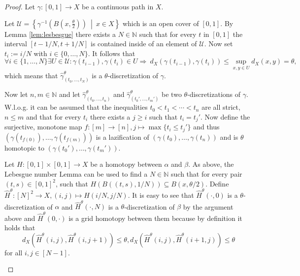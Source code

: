 \documentclass[a4paper, 11pt, twoside]{article}
\newcommand{\N}[0]{\mathbb{N}}
\theoremstyle{break}
\theoremstyle{break}
\begin{document}
\begin{proof}
  Let $\gamma\colon [0,1] \to X$ be a continuous path in $X$. 
  
  Let $\mathcal{U} = \left\{\gamma^{-1}\left(B(x,\tfrac{\theta}{2})\right) \: \middle| \: x \in X \right\}$ which is an open cover of $[0,1]$.
  By Lemma \ref{lem:lesbesgue} there exists a $N \in \N$ such that for every $t$ in $[0,1]$ the interval $[t-1/N, t+1/N]$ is contained inside of an element of $\mathcal{U}$.
  Now set $t_i := i/N$ with $i \in \{0, \ldots, N\}$. It follows that
  \begin{equation*}
    \forall i \in \{1, \ldots, N\}\exists U \in \mathcal{U}\colon \gamma(t_{i-1}), \gamma(t_i) \in U \Rightarrow \: d_X(\gamma(t_{i-1}), \gamma(t_i)) \leq \sup\limits_{x,y \in U} d_X(x,y) = \theta,
  \end{equation*}
  which means that $\widehat{\gamma}^{\theta}_{(t_0, \ldots, t_N)}$ is a $\theta$-discretization of $\gamma$.

  Now let $n,m \in \N$ and let $\widehat{\gamma}_{(t_0, \ldots, t_n)}^{\theta}$ and $\widehat{\gamma}_{(t_0', \ldots, t_m')}^{\theta}$ be two $\theta$-discretizations of $\gamma$.
  W.l.o.g. it can be assumed that the inequalities $t_0 < t_1 < \cdots < t_n$ are all strict, $n \leq m$ and that for every $t_i$ there exists a $j \geq i$ such that $t_i = t_j'$.
  Now define the surjective, monotone map $f\colon [m] \to [n], j \mapsto \max \{t_i \leq t_j'\}$ 
  and thus $(\gamma(t_{f(0)}), \ldots, \gamma(t_{f(m)}))$ is a lazification of $(\gamma(t_0), \ldots, \gamma(t_n))$ and is $\theta$ homotopic to $(\gamma(t_0'), \ldots, \gamma(t_m'))$.
  
  Let $H\colon [0,1] \times [0,1] \to X$ be a homotopy between $\alpha$ and $\beta$. As above, the Lebesgue number Lemma can be used to find a $N \in \N$ 
  such that for every pair $(t,s) \in [0,1]^2$, such that $H(B((t,s),1/N)) \subseteq B(x, \theta/2)$.
  Define $\widehat{H}^{\theta}\colon [N]^2 \to X, (i,j) \mapsto H(i/N, j/N)$. It is easy to see that $\widehat{H}^{\theta}(\cdot, 0)$ is a $\theta$-discretization of $\alpha$ and
  $\widehat{H}^{\theta}(\cdot, N)$ is a $\theta$-discretization of $\beta$ by the argument above and $\widehat{H}^{\theta}(0, \cdot)$ is a grid homotopy between them because by definition it holds that
  \begin{equation*}
    d_X(\widehat{H}^{\theta}(i,j), \widehat{H}^{\theta}(i,j+1)) \leq \theta, d_X(\widehat{H}^{\theta}(i,j), \widehat{H}^{\theta}(i+1,j)) \leq \theta
  \end{equation*}
  for all $i, j \in [N-1]$.

  \cite[p. 4]{vigolo2018fundamental}
\end{proof}
\end{document}
